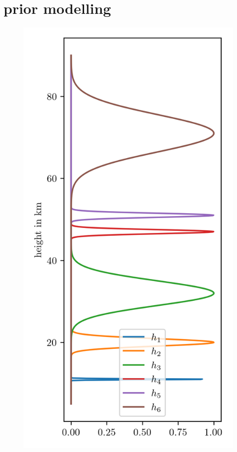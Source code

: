 \chapter{prior modelling}

\begin{figure}[ht!]
	\centering
	
	\caption[]{}
	\label{fig:}
\end{figure}


\begin{figure}[ht!]
	\centering
	
	\caption[]{}
	\label{fig:}
\end{figure}

\begin{figure}[ht!]
	\centering
	\includegraphics{HeightPriors.png}
	\caption[]{}
	\label{fig:}
\end{figure}


